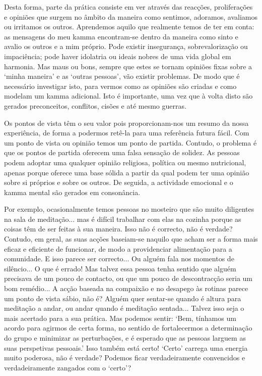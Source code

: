 Desta forma, parte da prática consiste em ver através das reacções, proliferações e opiniões que surgem no âmbito da maneira como sentimos, adoramos, avaliamos ou irritamos os outros. Aprendemos aquilo que realmente temos de ter em conta: as mensagens do meu kamma encontram-se dentro da maneira como sinto e avalio os outros e a mim próprio. Pode existir insegurança, sobrevalorização ou impaciência; pode haver idolatria ou ideais nobres de uma vida global em harmonia. Mas maus ou bons, sempre que estes se tornam opiniões fixas sobre a `minha maneira' e as `outras pessoas', vão existir problemas. De modo que é necessário investigar isto, para vermos como as opiniões são criadas e como modelam um kamma adicional. Isto é importante, uma vez que à volta disto são gerados preconceitos, conflitos, cisões e até mesmo guerras.

Os pontos de vista têm o seu valor pois proporcionam-nos um resumo da nossa experiência, de forma a podermos retê-la para uma referência futura fácil. Com um ponto de vista ou opinião temos um ponto de partida. Contudo, o problema é que os pontos de partida oferecem uma falsa sensação de solidez. As pessoas podem adoptar uma qualquer opinião religiosa, política ou mesmo nutricional, apenas porque oferece uma base sólida a partir da qual podem ter uma opinião sobre si próprios e sobre os outros. De seguida, a actividade emocional e o kamma mental são gerados em consonância.

Por exemplo, ocasionalmente temos pessoas no mosteiro que são muito diligentes na sala de meditação... mas é difícil trabalhar com elas na cozinha porque as coisas têm de ser feitas à sua maneira. Isso não é correcto, não é verdade? Contudo, em geral, as suas acções baseiam-se naquilo que acham ser a forma mais eficaz e eficiente de funcionar, de modo a providenciar alimentação para a comunidade. E isso parece ser correcto... Ou alguém fala nos momentos de silêncio... O que é errado! Mas talvez essa pessoa tenha sentido que alguém precisava de um pouco de contacto, ou que um pouco de descontracção seria um bom remédio... A acção baseada na compaixão e no desapego às rotinas parece um ponto de vista sábio, não é? Alguém quer sentar-se quando é altura para meditação a andar, ou andar quando é meditação sentada... Talvez isso seja o mais acertado para a sua prática. Mas podemos sentir: `Bem, tínhamos um acordo para agirmos de certa forma, no sentido de fortalecermos a determinação do grupo e minimizar as perturbações, e é esperado que as pessoas larguem as suas perspetivas pessoais.' Isso também está certo! `Certo' carrega uma energia muito poderosa, não é verdade? Podemos ficar verdadeiramente convencidos e verdadeiramente zangados com o `certo'?

